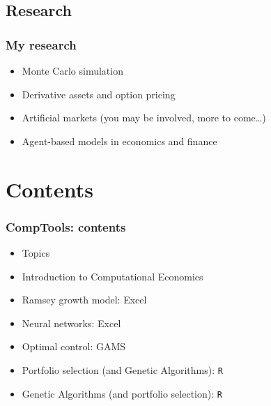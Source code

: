 \documentclass[handout,a4paper]{beamer} 			%
\begin{document}
\subsection{Research}
\begin{frame}
    \frametitle{My research}

\begin{itemize}
	    \item<1-> Monte Carlo simulation
	    	    
	    \item<2-> Derivative assets and option pricing
	    
	    \item<3-> Artificial markets \alert<3>{(you may be 
	    involved, more to come\ldots)}
	    
	    \item<4-> Agent-based models in economics and finance
	    
	\end{itemize}
\end{frame}

\section{Contents}
\begin{frame}
    \frametitle{CompTools: contents}
 \begin{itemize}
     
     \item[] Topics
     
	 \item Introduction to Computational Economics
     
         \item Ramsey growth model: Excel
	 
	 \item Neural networks: Excel
	 
	 \item Optimal control: GAMS
	 
	 \item Portfolio selection (and Genetic Algorithms): \texttt{R}
	 
	 \item Genetic Algorithms (and portfolio selection): \texttt{R}
     \end{itemize}
\end{frame}



\end{document}
